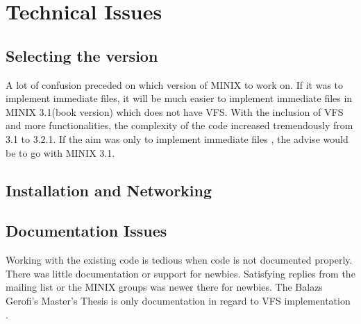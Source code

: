 \chapter{Technical Issues}

\section{Selecting the version} 

A lot of confusion preceded on which version of MINIX to work on. If it was to implement immediate files, it will be much easier to implement immediate files in MINIX 3.1(book version) which does not have VFS. With the inclusion of VFS and more functionalities, the complexity of the code increased tremendously from 3.1 to 3.2.1. If the aim was only to implement immediate files , the advise would be to go with MINIX 3.1.

\section{Installation and Networking}

 

\section{Documentation Issues}

Working with the existing code is tedious when code is not documented properly. There was little documentation or support for newbies. Satisfying replies from the mailing list or the MINIX groups was newer there for newbies. The  Balazs Gerofi's Master's Thesis is only documentation in regard to VFS implementation \cite{vfs}.
